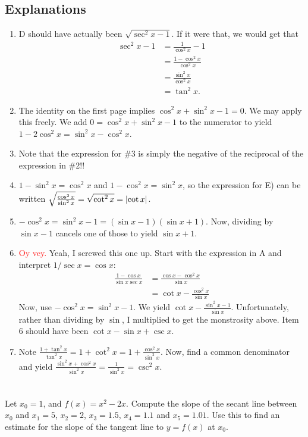 \documentclass[english]{article}
\DeclarePairedDelimiter\abs{\lvert}{\rvert}%
\newcommand{\prob}[1]{\setcounter{section}{#1-1}\section{}}
\newcommand{\prt}[1]{\setcounter{subsection}{#1-1}\subsection{}}
\theoremstyle{remark}
\theoremstyle{definition}
\begin{document}
\subsection*{Explanations}
\begin{enumerate}
\item D should have actually been $\sqrt{\sec^2x-1}$. If it were that, we would get that \begin{align*}
	\sec^2x-1&=\frac{1}{\cos^2x}-1\\&=\frac{1-\cos^2x}{\cos^2x}\\&=\frac{\sin^2x}{\cos^2x}\\&=\tan^2x.
\end{align*}
\item The identity on the first page implies $\cos^2x+\sin^2x-1=0$. We may apply this freely. We add $0=\cos^2x+\sin^2x-1$ to the numerator to yield $1-2\cos^2x=\sin^2x-\cos^2x$.
\item Note that the expression for \#3 is simply the negative of the reciprocal of the expression in \#2!!
\item $1-\sin^2x=\cos^2x$ and $1-\cos^2x=\sin^2x$, so the expression for E) can be written $\sqrt{\frac{\cos^2x}{\sin^2x}}=\sqrt{\cot^2x}=\abs{\cot x}$.
\item $-\cos^2x=\sin^2x-1=(\sin x-1)(\sin x+1)$. Now, dividing by $\sin x-1$ cancels one of those to yield $\sin x+1$. 
\item \textcolor{red}{Oy vey.} Yeah, I screwed this one up. Start with the expression in A and interpret $1/\sec x=\cos x$:
\begin{align*}
	\frac{1-\cos x}{\sin x \sec x}&= \frac{\cos x-\cos^2x}{\sin x}\\&=\cot x-\frac{\cos^2x}{\sin x}
\end{align*}
Now, use $-\cos^2x=\sin^2x-1$. We yield $\cot x-\frac{\sin^2x-1}{\sin x}$. Unfortunately, rather than dividing by $\sin$, I multiplied to get the monstrosity above. Item 6 should have been $\cot x-\sin x+\csc x$. 
\item Note $\frac{1+\tan^2x}{\tan^2x}=1+\cot^2x=1+\frac{\cos^2x}{\sin^2x}$. Now, find a common denominator and yield $\frac{\sin^2x+\cos^2x}{\sin^2x}=\frac{1}{\sin^2x}=\csc^2x$. 
\end{enumerate}
\vspace{5cm}
\prob{2}\prt{1}
Let $x_0=1$, and $f(x)=x^2-2x$. Compute the slope of the secant line between $x_0$ and $x_1=5$, $x_2=2$, $x_3=1.5$, $x_4=1.1$ and $x_5=1.01$. Use this to find an estimate for the slope of the tangent line to $y=f(x)$ at $x_0$.
\end{document}
